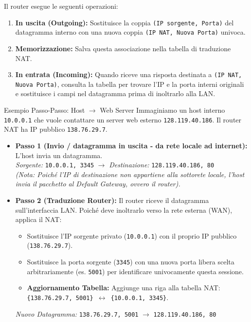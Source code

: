 \documentclass[a4paper,12pt]{report}
\begin{document}
Il router esegue le seguenti operazioni:
\begin{enumerate}
    \item \textbf{In uscita (Outgoing):} Sostituisce la coppia \texttt{(IP sorgente, Porta)} del datagramma interno con una nuova coppia \texttt{(IP NAT, Nuova Porta)} univoca.
    \item \textbf{Memorizzazione:} Salva questa associazione nella tabella di traduzione NAT.
    \item \textbf{In entrata (Incoming):} Quando riceve una risposta destinata a \texttt{(IP NAT, Nuova Porta)}, consulta la tabella per trovare l'IP e la porta interni originali e sostituisce i campi nel datagramma prima di inoltrarlo alla LAN.
\end{enumerate}

\newpage
\begin{esempiobox}{Esempio Passo-Passo: Host $\to$ Web Server}
    Immaginiamo un host interno \texttt{10.0.0.1} che vuole contattare un server web esterno \texttt{128.119.40.186}. Il router NAT ha IP pubblico \texttt{138.76.29.7}.

    \begin{itemize}
        \item \textbf{Passo 1 (Invio / datagramma in uscita - da rete locale ad internet):} L'host invia un datagramma.
        \\ \textit{Sorgente:} \texttt{10.0.0.1, 3345} $\to$ \textit{Destinazione:} \texttt{128.119.40.186, 80}
        \\ \textit{(Nota: Poiché l'IP di destinazione non appartiene alla sottorete locale, l'host invia il pacchetto al Default Gateway, ovvero il router).}
        
        \item \textbf{Passo 2 (Traduzione Router):} Il router riceve il datagramma sull'interfaccia LAN. Poiché deve inoltrarlo verso la rete esterna (WAN), applica il NAT:
        \begin{itemize}
            \item Sostituisce l'IP sorgente privato (\texttt{10.0.0.1}) con il proprio IP pubblico (\texttt{138.76.29.7}).
            \item Sostituisce la porta sorgente (\texttt{3345}) con una nuova porta libera scelta arbitrariamente (es. \texttt{5001}) per identificare univocamente questa sessione.
            \item \textbf{Aggiornamento Tabella:} Aggiunge una riga alla tabella NAT: \texttt{\{138.76.29.7, 5001\} $\leftrightarrow$ \{10.0.0.1, 3345\}}.
        \end{itemize}
        \textit{Nuovo Datagramma:} \texttt{138.76.29.7, 5001} $\to$ \texttt{128.119.40.186, 80}
        

\end{itemize}
\end{esempiobox}
\end{document}
